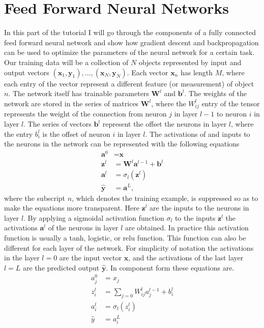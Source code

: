 \documentclass{article}
\begin{document}
\section*{Feed Forward Neural Networks}
In this part of the tutorial I will go through the components of a fully connected feed forward neural network and show how gradient descent and backpropagation can be used to optimize the parameters of the neural network for a certain task. Our training data will be a collection of $N$ objects represented by input and output vectors $(\textbf{x}_1, \textbf{y}_1),...,(\textbf{x}_N, \textbf{y}_N)$. Each vector $\textbf{x}_n$ has length $M$, where each entry of the vector represent a different feature (or measurement) of object $n$. The network itself has trainable parameters $\textbf{W}^l$ and $\textbf{b}^l$. The weights of the network are stored in the series of matrices $\textbf{W}^l$, where the $W_{ij}^l$ entry of the tensor represents the weight of the connection from neuron $j$ in layer $l-1$ to neuron $i$ in layer $l$. The series of vectors $\textbf{b}^l$ represent the offset the neurons in layer $l$, where the entry $b_{i}^l$ is the offset of neuron $i$ in layer $l$. The activations of and inputs to the neurons in the network can be represented with the following equations
\begin{equation}	
\begin{split}
\textbf{a}^0 &= \textbf{x} \\
\textbf{z}^l &= \textbf{W}^l \textbf{a}^{l-1} + \textbf{b}^l \\
\textbf{a}^l &= \sigma_l (\textbf{z}^l) \\
\hat{\textbf{y}} &= \textbf{a}^{L},
\end{split}
\end{equation}
where the subscript $n$, which denotes the training example, is suppressed so as to make the equations more transparent. Here $\textbf{z}^l$ are the inputs to the neurons in layer $l$. By applying a sigmoidal activation function $\sigma_l$ to the inputs $\textbf{z}^l$ the activations $\textbf{a}^l$ of the neurons in layer $l$ are obtained. In practice this activation function is usually a tanh, logistic, or relu function. This function can also be different for each layer of the network. For simplicity of notation the activations in the layer $l=0$ are the input vector $\textbf{x}$, and the activations of the last layer $l=L$ are the predicted output $\hat{\textbf{y}}$. In component form these equations are.
\begin{equation}
\label{eq:nn_components}
\begin{split}
a_j^0 &= x_j \\
z_i^l &= \sum_{j=0} W_{ij}^l a_j^{l-1} + b_i^l \\
a_i^l &= \sigma_l (z_i^l) \\
\hat{y} &= a_i^{L}
\end{split}
\end{equation}
\end{document}
